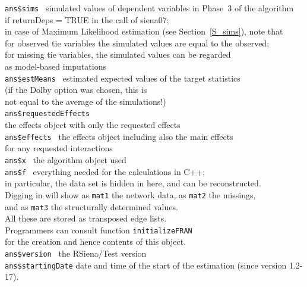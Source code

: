\documentclass[a4paper,fleqn,11pt]{article}
\newcommand{\+}{\, + \,}
\begin{document}
\begin{tabbing}
 \texttt{ans\$sims }         \> simulated values of dependent variables
                                      in Phase~3 of the algorithm     \\
                             \>  if \textsf{returnDeps = TRUE}
                                        in the call of \textsf{siena07}; \\
                             \> in case of Maximum Likelihood estimation (see Section~\ref{S_sims}), note that \\
                             \> for observed tie variables the simulated values are
                             equal to the observed; \\
                             \> for missing tie variables, the simulated values can be regarded \\
                             \> as model-based imputations \\
 \texttt{ans\$estMeans }     \> estimated expected values of the target statistics\\
                             \> (if the Dolby option was chosen, this is \\
                             \> not equal to the average of the simulations!)\\
 \texttt{ans\$requestedEffects }  \\
                            \> the effects object with only the requested effects\\
 \texttt{ans\$effects }      \> the effects object including also the main effects\\
                                \> for any requested interactions\\
 \texttt{ans\$x }            \> the algorithm object used\\
 \texttt{ans\$f }            \> everything needed for the calculations in C++;\\
                             \> in particular, the data set is hidden in here,
                                and can be reconstructed.\\
                             \> Digging in will show as \texttt{mat1} the network data,
                                 as \texttt{mat2} the missings, \\
                             \>   and as \texttt{mat3} the structurally determined values.\\
                             \> All these are stored as transposed edge lists.\\
                             \> Programmers can consult function \texttt{initializeFRAN}\\
                             \> for the creation and hence contents of this object.\\
 \texttt{ans\$version }      \> the \textsf{RSiena/Test} version\\
 \texttt{ans\$startingDate}  \> date and time of the start of the estimation (since version 1.2-17).\\

\end{tabbing}
\end{document}
